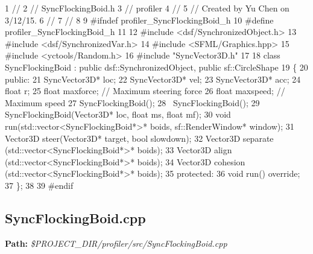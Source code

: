 \begin{DoxyCodeInclude}
1 \textcolor{comment}{//}
2 \textcolor{comment}{//  SyncFlockingBoid.h}
3 \textcolor{comment}{//  profiler}
4 \textcolor{comment}{//}
5 \textcolor{comment}{//  Created by Yu Chen on 3/12/15.}
6 \textcolor{comment}{//}
7 \textcolor{comment}{//}
8 
9 \textcolor{preprocessor}{#ifndef profiler\_SyncFlockingBoid\_h}
10 \textcolor{preprocessor}{#define profiler\_SyncFlockingBoid\_h}
11 
12 \textcolor{preprocessor}{#include <dsf/SynchronizedObject.h>}
13 \textcolor{preprocessor}{#include <dsf/SynchronizedVar.h>}
14 \textcolor{preprocessor}{#include <SFML/Graphics.hpp>}
15 \textcolor{preprocessor}{#include <yctools/Random.h>}
16 \textcolor{preprocessor}{#include "SyncVector3D.h"}
17 
18 \textcolor{keyword}{class }SyncFlockingBoid : \textcolor{keyword}{public} dsf::SynchronizedObject, \textcolor{keyword}{public} sf::CircleShape
19 \{
20 \textcolor{keyword}{public}:
21     SyncVector3D* loc;
22     SyncVector3D* vel;
23     SyncVector3D* acc;
24     \textcolor{keywordtype}{float} r;
25     \textcolor{keywordtype}{float} maxforce;    \textcolor{comment}{// Maximum steering force}
26     \textcolor{keywordtype}{float} maxspeed;    \textcolor{comment}{// Maximum speed}
27     SyncFlockingBoid();
28     ~SyncFlockingBoid();
29     SyncFlockingBoid(Vector3D* loc, \textcolor{keywordtype}{float} ms, \textcolor{keywordtype}{float} mf);
30     \textcolor{keywordtype}{void} run(std::vector<SyncFlockingBoid*>* boids, sf::RenderWindow* window);
31     Vector3D steer(Vector3D* target, \textcolor{keywordtype}{bool} slowdown);
32     Vector3D separate (std::vector<SyncFlockingBoid*>* boids);
33     Vector3D align (std::vector<SyncFlockingBoid*>* boids);
34     Vector3D cohesion (std::vector<SyncFlockingBoid*>* boids);
35 \textcolor{keyword}{protected}:
36     \textcolor{keywordtype}{void} run() \textcolor{keyword}{override};
37 \};
38 
39 \textcolor{preprocessor}{#endif}
\end{DoxyCodeInclude}
 \hypertarget{_benchmark_program_BenchmarkProgramSyncFlockingBoid_cpp}{}\subsection{Sync\+Flocking\+Boid.\+cpp}\label{_benchmark_program_BenchmarkProgramSyncFlockingBoid_cpp}
{\bfseries Path\+:} {\itshape \$\+P\+R\+O\+J\+E\+C\+T\+\_\+\+D\+I\+R/profiler/src/\+Sync\+Flocking\+Boid.cpp} 
